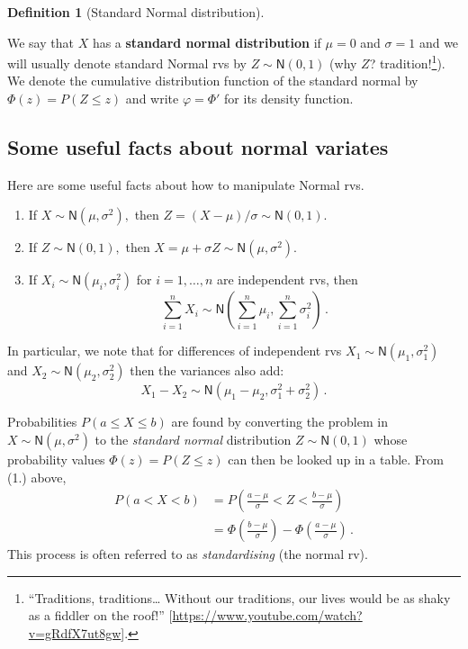 \documentclass[
  a4paper,
  oneside]{book}
\providecommand{\tightlist}{%
  \setlength{\itemsep}{0pt}\setlength{\parskip}{0pt}}\usepackage{longtable,booktabs,array}
\theoremstyle{definition}
\newtheorem{definition}{Definition}[chapter]
\theoremstyle{definition}
\theoremstyle{definition}
\theoremstyle{plain}
\theoremstyle{remark}
\begin{document}
\begin{definition}[Standard Normal
distribution]\protect\hypertarget{def-standard-normal}{}\label{def-standard-normal}

We say that \(X\) has a \textbf{standard normal distribution} if
\(\mu=0\) and \(\sigma = 1\) and we will usually denote standard Normal
rvs by \(Z \sim \mathsf{N}(0,1)\) (why \(Z\)? tradition!\footnote{``Traditions,
  traditions\ldots{} Without our traditions, our lives would be as shaky
  as a fiddler on the roof!''
  {[}\url{https://www.youtube.com/watch?v=gRdfX7ut8gw}{]}.}). We denote
the cumulative distribution function of the standard normal by
\(\Phi(z) = P(Z \leq z)\) and write \(\varphi = \Phi'\) for its density
function.

\end{definition}

\subsection{Some useful facts about normal
variates}\label{sec-facts-normals}

Here are some useful facts about how to manipulate Normal rvs.

\begin{enumerate}
\def\labelenumi{\arabic{enumi}.}
\tightlist
\item
  If \(X \sim \mathsf{N}(\mu, \sigma^2),\) then
  \(Z = (X - \mu) / \sigma  \sim \mathsf{N}(0,1).\)
\item
  If \(Z \sim \mathsf{N}(0, 1),\) then
  \(X = \mu + \sigma Z \sim \mathsf{N}(\mu, \sigma^2).\)
\item
  If \(X_i \sim \mathsf{N}(\mu_i, \sigma_i^2)\) for \(i = 1, \dots, n\)
  are independent rvs, then
  \[\sum_{i=1}^{n} X_i \sim \mathsf{N} \left( \sum_{i=1}^{n} \mu_i, \sum_{i=1}^{n} \sigma_i^2 \right) \,.\]
\end{enumerate}

In particular, we note that for differences of independent rvs
\(X_1 \sim \mathsf{N}(\mu_1, \sigma_1^2)\) and
\(X_2 \sim \mathsf{N}(\mu_2, \sigma_2^2)\) then the variances also add:
\[ X_1 - X_2 \sim \mathsf{N}(\mu_1 - \mu_2, \sigma_1^2 + \sigma_2^2) \,.\]

Probabilities \(P(a \leq X \leq b)\) are found by converting the problem
in \(X \sim \mathsf{N}(\mu, \sigma^2)\) to the \emph{standard normal}
distribution \(Z \sim \mathsf{N}(0, 1)\) whose probability values
\(\Phi(z) = P(Z\leq z)\) can then be looked up in a table. From (1.)
above, \[
\begin{aligned}
   P(a < X < b) &= P\left( \frac{a-\mu}{\sigma} < Z < \frac{b-\mu}{\sigma} \right) \\ 
    &= \Phi \left( \frac{b-\mu}{\sigma}\right) - \Phi\left(\frac{a-\mu}{\sigma}\right) \,.
\end{aligned}
\] This process is often referred to as \emph{standardising} (the normal
rv).
\end{document}
